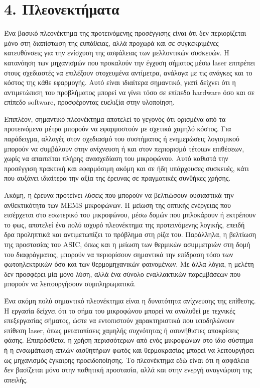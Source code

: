 \documentclass[12pt,a4paper]{report}
\begin{document}
	
	\vspace{1cm}
	
    \chapter*{4. Πλεονεκτήματα}
		Ένα βασικό πλεονέκτημα της προτεινόμενης προσέγγισης είναι ότι δεν περιορίζεται μόνο στη διαπίστωση της ευπάθειας, αλλά προχωρά και σε συγκεκριμένες κατευθύνσεις για την ενίσχυση της ασφάλειας των μελλοντικών συσκευών. Η κατανόηση των μηχανισμών που προκαλούν την έγχυση σήματος μέσω laser επιτρέπει στους σχεδιαστές να επιλέξουν στοχευμένα αντίμετρα, ανάλογα με τις ανάγκες και το κόστος της κάθε εφαρμογής. Αυτό είναι ιδιαίτερα σημαντικό, γιατί δείχνει ότι η αντιμετώπιση του προβλήματος μπορεί να γίνει τόσο σε επίπεδο hardware όσο και σε επίπεδο software, προσφέροντας ευελιξία στην υλοποίηση.
	
	Επιπλέον, σημαντικό πλεονέκτημα αποτελεί το γεγονός ότι ορισμένα από τα προτεινόμενα μέτρα μπορούν να εφαρμοστούν με σχετικά χαμηλό κόστος. Για παράδειγμα, αλλαγές στον σχεδιασμό του συστήματος ή ενημερώσεις λογισμικού μπορούν να συμβάλουν στην ανίχνευση ή και στον περιορισμό τέτοιων επιθέσεων, χωρίς να απαιτείται πλήρης ανασχεδίαση του μικροφώνου. Αυτό καθιστά την προσέγγιση πρακτική και εφαρμόσιμη ακόμη και σε ήδη υπάρχουσες συσκευές, κάτι που αυξάνει ιδιαίτερα την αξία της έρευνας σε πραγματικές συνθήκες χρήσης.
	
	Ακόμη, η έρευνα προτείνει λύσεις που μπορούν να βελτιώσουν ουσιαστικά την ανθεκτικότητα των MEMS μικροφώνων. Η μείωση της οπτικής ενέργειας που εισέρχεται στο εσωτερικό του μικροφώνου, μέσω δομών που μπλοκάρουν ή εκτρέπουν το φως, αποτελεί ένα πολύ ισχυρό πλεονέκτημα της προτεινόμενης λογικής, επειδή δρα προληπτικά και αντιμετωπίζει το πρόβλημα στη ρίζα του. Παράλληλα, η βελτίωση της προστασίας του ASIC, όπως και η μείωση των θερμικών ασυμμετριών στη δομή του διαφράγματος, μπορούν να περιορίσουν σημαντικά την επίδραση τόσο των φωτοηλεκτρικών όσο και των θερμομηχανικών φαινομένων. Με άλλα λόγια, η μελέτη δεν προσφέρει μία μόνο λύση, αλλά ένα σύνολο εναλλακτικών παρεμβάσεων που μπορούν να λειτουργήσουν συμπληρωματικά.
	
	Ένα ακόμη πολύ σημαντικό πλεονέκτημα είναι η δυνατότητα ανίχνευσης της επίθεσης. Η εργασία δείχνει ότι το σήμα του μικροφώνου μπορεί να αναλυθεί με τεχνικές επεξεργασίας σήματος, ώστε να εντοπιστούν χαρακτηριστικά που υποδηλώνουν επίθεση laser, όπως μετατοπίσεις χαμηλής συχνότητας ή ασυνήθιστες αποκρίσεις φάσης. Επιπρόσθετα, η χρήση περισσότερων από ενός μικροφώνων στο ίδιο σύστημα ή η ενσωμάτωση απλών αισθητήρων φωτός και θερμοκρασίας μπορεί να λειτουργήσει ως μηχανισμός έγκαιρης προειδοποίησης. Το πλεονέκτημα εδώ είναι ότι η ασφάλεια δεν βασίζεται μόνο στην παθητική προστασία, αλλά και στην ενεργή αναγνώριση της απειλής.
	
\end{document}
